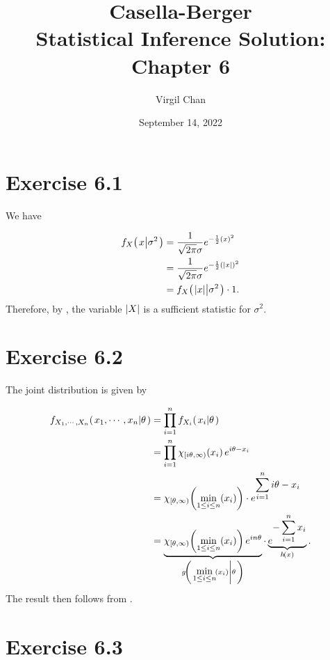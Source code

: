 \documentclass[12pt,letterpaper,reqno]{amsart}
\author{Virgil Chan}
\title{Casella-Berger \\ Statistical Inference Solution: \\ Chapter 6}
\date{September 14, 2022}
\numberwithin{equation}{subsection}
\begin{document}
\maketitle

\tableofcontents

\newpage
\section{Exercise 6.1}

We have

\begin{align*}
    {f_X}\! \left( {\left. {x} \middle| {\sigma^2} \right.} \right) &= \frac{1}{\sqrt{2\pi} {\sigma}} e^{-\frac{1}{2} \left( {x} \right)^2} \\
                                       &= \frac{1}{\sqrt{2\pi} {\sigma}} e^{-\frac{1}{2} \left( {\left\lvert{x}\right\rvert} \right)^2} \\
                                       &= {f_{X}}\! \left( {\left. {\left\lvert{x}\right\rvert} \middle| {\sigma^2} \right.} \right) \cdot 1.
\end{align*}
Therefore, by \cite[Factorization Theorem 6.2.6 on page 276]{Berger-Casella}, the variable $\left\lvert{X}\right\rvert$ is a sufficient statistic for $\sigma^2$.

\newpage
\section{Exercise 6.2}

The joint distribution is given by

\begin{align*}
    \fun{f_{X_1, \cdots, X_n}}{\conditbar{x_1, \cdots, x_n}{\theta}} &= \prod_{i=1}^n \fun{f_{X_i}}{\conditbar{x_i}{\theta}} \\
    &= \prod_{i=1}^n \fun{\chi_{[i\theta, \infty)}}{x_i} e^{i\theta - x_i} \\
    &= \fun{\chi_{\left[ \theta, \infty \right)}}{\fun{\min_{1 \leq i \leq n}}{x_i}} \cdot e^{\displaystyle \sum_{i=1}^n i\theta - x_i} \\
    &= \underbrace{\fun{\chi_{\left[ \theta, \infty \right)}}{\fun{\min_{1 \leq i \leq n}}{x_i}} e^{in\theta}}_{\fun{g}{\conditbar{\fun{\displaystyle \min_{1 \leq i \leq n}}{x_i}}{\theta}}} \cdot \underbrace{e^{\displaystyle -\sum_{i=1}^n x_i}}_{\fun{h}{x}}.
\end{align*}
The result then follows from  \cite[Factorization Theorem 6.2.6 on page 276]{Berger-Casella}.

\newpage
\section{Exercise 6.3}
\end{document}

